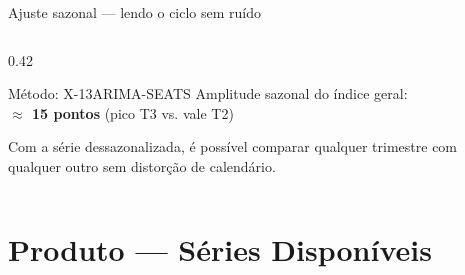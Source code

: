 \documentclass[aspectratio=169, 11pt]{beamer}
\begin{document}
\begin{frame}{Ajuste sazonal — lendo o ciclo sem ruído}
\begin{columns}[T]
\begin{column}{0.42\textwidth}
\begin{exampleblock}{Método: X-13ARIMA-SEATS}
        \vspace{0.2cm}
        Amplitude sazonal do índice geral:\\
        \textbf{$\approx$ 15 pontos} (pico T3 vs. vale T2)
      \end{exampleblock}

      \vspace{0.2cm}
      {\small Com a série dessazonalizada, é possível comparar qualquer
      trimestre com qualquer outro sem distorção de calendário.}
    \end{column}
  \end{columns}

\end{frame}

\section{Produto — Séries Disponíveis}
\end{document}
